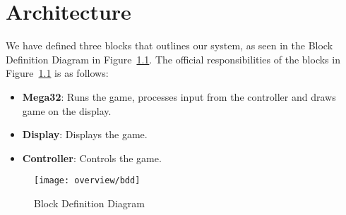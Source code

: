 \chapter{Architecture}

We have defined three blocks that outlines our system, as seen in the Block Definition Diagram in Figure~\ref{fig:bdd}. The official responsibilities of the blocks in Figure~\ref{fig:bdd} is as follows:

\begin{itemize}
	\item \textbf{Mega32}: Runs the game, processes input from the controller and draws game on the display.
	\item \textbf{Display}: Displays the game.
	\item \textbf{Controller}: Controls the game.
\end{itemize}

\begin{figure}
\centering
\texttt{[image: overview/bdd]}
\caption{Block Definition Diagram}
\label{fig:bdd}
\end{figure}



